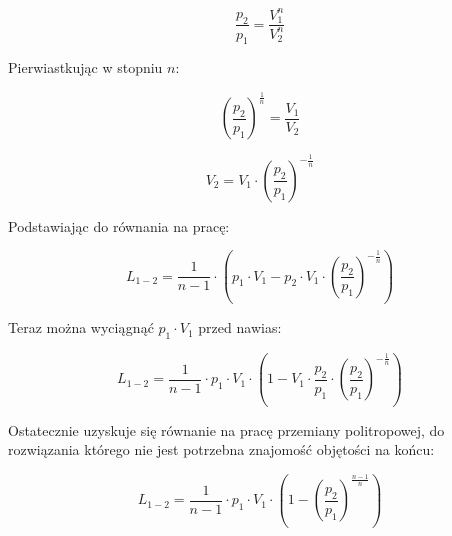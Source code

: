 \[\frac{p_2}{p_1} = \frac{V_1 ^n}{V_2 ^n} \]

Pierwiastkując w stopniu $n$:

\[\left( \frac{p_2}{p_1} \right) ^{\frac{1}{n}} = \frac{V_1}{V_2} \]

\[V_2 = V_1 \cdot \left( \frac{p_2}{p_1} \right) ^{-\frac{1}{n}} \]

Podstawiając do równania na pracę:

\[L_{1-2} = \frac{1}{n-1} \cdot \left( p_1 \cdot V_1 - p_2 \cdot V_1 \cdot \left( \frac{p_2}{p_1} \right) ^{-\frac{1}{n}}  \right)\]

Teraz można wyciągnąć $p_1 \cdot V_1$ przed nawias:

\[L_{1-2} = \frac{1}{n-1} \cdot  p_1 \cdot V_1\cdot \left(1 - V_1 \cdot \frac{p_2}{p_1} \cdot  \left( \frac{p_2}{p_1} \right) ^{-\frac{1}{n}}  \right)\]

Ostatecznie uzyskuje się równanie na pracę przemiany politropowej, do rozwiązania którego nie jest potrzebna znajomość objętości na końcu:

\[L_{1-2} = \frac{1}{n-1} \cdot  p_1 \cdot V_1\cdot \left(1 - \left( \frac{p_2}{p_1} \right) ^{\frac{n-1}{n}}  \right)\]
